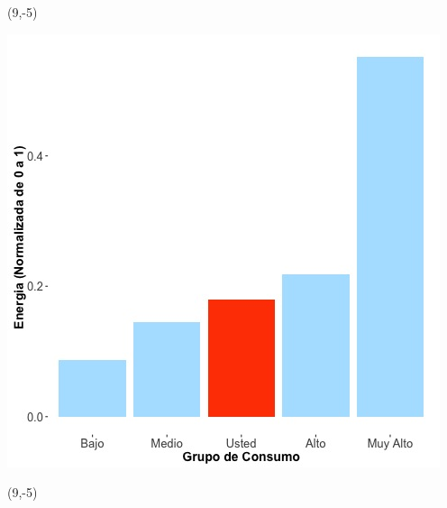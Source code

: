 \documentclass{article}\usepackage[]{graphicx}\usepackage[]{color}
\newenvironment{knitrout}{}{} %
\begin{document}
 \begin{textblock}{1}(9,-5)
\begin{minipage}{20em}
\begingroup

\endgroup
\end{minipage}
\end{textblock}


\begin{knitrout}
\color{fgcolor}
\includegraphics[scale=0.65]{figure/A20_neighbor_plot} 
\end{knitrout}

 \begin{textblock}{1}(9,-5)
\begin{minipage}{20em}
\begingroup

\endgroup
\end{minipage}
\end{textblock}
\end{document}
